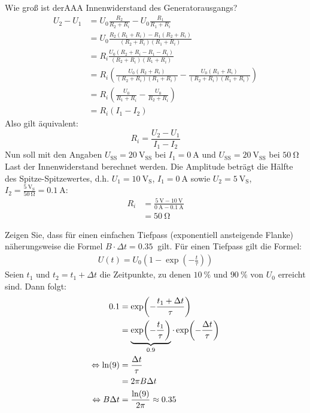 \documentclass[ngerman]{scrartcl}
\theoremstyle{definition}
\begin{document}
		\begin{voraufgabe}{Wie groß ist derAAA Innenwiderstand des Generatorausgangs?}
			\begin{align*}
				U_2-U_1 &= U_0\frac{R_2}{R_2+R_i}-U_0\frac{R_1}{R_1+R_i} \\
				&= U_0\frac{R_2(R_1+R_i)-R_1(R_2+R_i)}{(R_2+R_i)(R_1+R_i)} \\
				&= R_i\frac{U_0(R_2+R_i-R_1-R_i)}{(R_2+R_i)(R_1+R_i)} \\
				&= R_i\left(\frac{U_0(R_2+R_i)}{(R_2+R_i)(R_1+R_i)} - \frac{U_0(R_1+R_i)}{(R_2+R_i)(R_1+R_i)}\right) \\
				&= R_i\left(\frac{U_0}{R_1+R_i} - \frac{U_0}{R_2+R_i}\right) \\
				&= R_i(I_1 - I_2)
			\end{align*}
			Also gilt äquivalent:
			\begin{equation*}
				R_i = \frac{U_2-U_1}{I_1-I_2}
			\end{equation*}
			Nun soll mit den Angaben $U_\mathrm{SS} = \SI{20}{\volt_\mathrm{SS}}$ bei $I_1=\SI{0}{\ampere}$ und $U_\mathrm{SS} = \SI{20}{\volt_\mathrm{SS}}$ bei $\SI{50}{\ohm}$ Last der Innenwiderstand berechnet werden. Die Amplitude beträgt die Hälfte des Spitze-Spitzewertes, d.h. $U_1 = \SI{10}{\volt_\mathrm{S}}$, $I_1 = \SI{0}{\ampere}$ sowie $U_2 = \SI{5}{\volt_\mathrm{S}}$, $I_2 = \frac{\SI{5}{\volt_\mathrm{S}}}{\SI{50}{\ohm}} = \SI{0,1}{\ampere}$:
			\begin{align*}
			    R_i &= \frac{\SI{5}{\volt}-\SI{10}{\volt}}{\SI{0}{\ampere}-\SI{0,1}{\ampere}} \\
    			&= \SI{50}{\ohm}
			\end{align*}
		\end{voraufgabe}
		\begin{voraufgabe}{Zeigen Sie, dass für einen einfachen Tiefpass (exponentiell ansteigende Flanke) näherungsweise die Formel $B \cdot \Delta t = \SI{0,35}{}$ gilt.}
		\label{voraufgabeD}
		Für einen Tiefpass gilt die Formel: 
		\begin{align*}
   			 U(t) = U_0 (1-\exp(-\frac{t}{\tau}))
		\end{align*}
		Seien $t_1$ und $t_2=t_1+\Delta t$ die Zeitpunkte, zu denen $\SI{10}{\percent}$ und $\SI{90}{\percent}$ von $U_0$ erreicht sind. Dann folgt:
		\begin{align*}
    		\SI{0,1}{} &= \exp(-\frac{t_1+\Delta t}{\tau}) \notag \\
    		&=\underbrace{\exp(-\frac{t_1}{\tau})}_{\SI{0,9}{}}\cdot\exp(-\frac{\Delta t}{\tau}) \notag \\
    		\Leftrightarrow \ln(9) &= \frac{\Delta t}{\tau} \notag \\
    		&= 2\pi B \Delta t \notag \\
    		\Leftrightarrow B \Delta t &= \frac{\ln(9)}{2\pi} \approx \SI{0,35}{}
    		\label{eq:035}
		\end{align*}

\end{voraufgabe}
\end{document}
